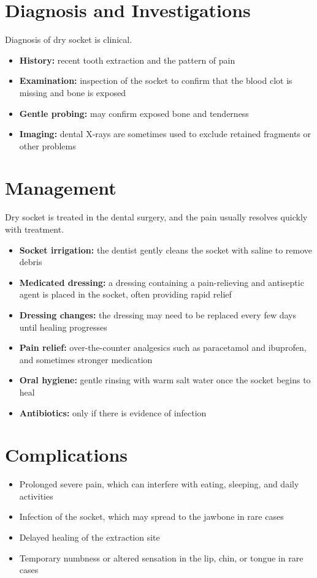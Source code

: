 \section*{Diagnosis and Investigations}
Diagnosis of dry socket is clinical.
\begin{itemize}
    \item \textbf{History:} recent tooth extraction and the pattern of pain
    \item \textbf{Examination:} inspection of the socket to confirm that the blood clot is missing and bone is exposed
    \item \textbf{Gentle probing:} may confirm exposed bone and tenderness
    \item \textbf{Imaging:} dental X-rays are sometimes used to exclude retained fragments or other problems
\end{itemize}

\section*{Management}
Dry socket is treated in the dental surgery, and the pain usually resolves quickly with treatment.
\begin{itemize}
    \item \textbf{Socket irrigation:} the dentist gently cleans the socket with saline to remove debris
    \item \textbf{Medicated dressing:} a dressing containing a pain-relieving and antiseptic agent is placed in the socket, often providing rapid relief
    \item \textbf{Dressing changes:} the dressing may need to be replaced every few days until healing progresses
    \item \textbf{Pain relief:} over-the-counter analgesics such as paracetamol and ibuprofen, and sometimes stronger medication
    \item \textbf{Oral hygiene:} gentle rinsing with warm salt water once the socket begins to heal
    \item \textbf{Antibiotics:} only if there is evidence of infection
\end{itemize}

\section*{Complications}
\begin{itemize}
    \item Prolonged severe pain, which can interfere with eating, sleeping, and daily activities
    \item Infection of the socket, which may spread to the jawbone in rare cases
    \item Delayed healing of the extraction site
    \item Temporary numbness or altered sensation in the lip, chin, or tongue in rare cases
\end{itemize}

